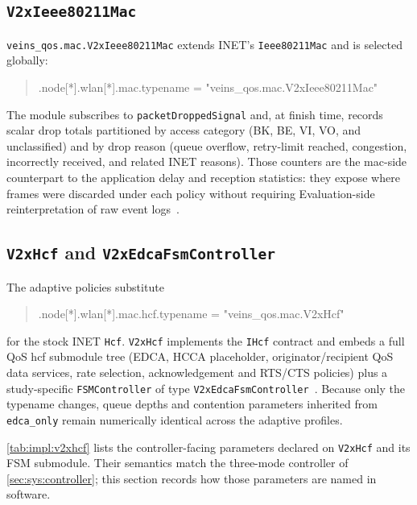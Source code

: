 \subsection{\texttt{V2xIeee80211Mac}}
\label{sec:impl:v2xmac}

\texttt{veins\_qos.mac.V2xIeee80211Mac} extends INET's \texttt{Ieee80211Mac} and is selected globally:

\begin{quote}
\footnotesize
\ttfamily *.node[*].wlan[*].mac.typename = "veins\_qos.mac.V2xIeee80211Mac"
\end{quote}

The module subscribes to \texttt{packetDroppedSignal} and, at finish time, records scalar drop totals partitioned by access category (BK, BE, VI, VO, and unclassified) and by drop reason (queue overflow, retry-limit reached, congestion, incorrectly received, and related INET reasons).
Those counters are the \gls{mac}-side counterpart to the application delay and reception statistics: they expose where frames were discarded under each policy without requiring Evaluation-side reinterpretation of raw event logs~\cite{aguiar2026_veins_qos}.

\subsection{\texttt{V2xHcf} and \texttt{V2xEdcaFsmController}}
\label{sec:impl:v2xhcf}

The adaptive policies substitute

\begin{quote}
\ttfamily *.node[*].wlan[*].mac.hcf.typename = "veins\_qos.mac.V2xHcf"
\end{quote}

for the stock INET \texttt{Hcf}.
\texttt{V2xHcf} implements the \texttt{IHcf} contract and embeds a full QoS \gls{hcf} submodule tree (EDCA, HCCA placeholder, originator/recipient QoS data services, rate selection, acknowledgement and RTS/CTS policies) plus a study-specific \texttt{FSMController} of type \texttt{V2xEdcaFsmController}~\cite{IEEE80211e_2005,aguiar2026_veins_qos}.
Because only the typename changes, queue depths and contention parameters inherited from \texttt{edca\_only} remain numerically identical across the adaptive profiles.

\autoref{tab:impl:v2xhcf} lists the controller-facing parameters declared on \texttt{V2xHcf} and its FSM submodule.
Their semantics match the three-mode controller of \autoref{sec:sys:controller}; this section records how those parameters are named in software.

